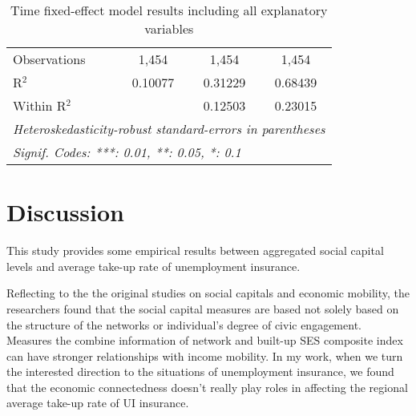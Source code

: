 \documentclass{article}
\begin{document}
\begin{table}[h!]
\begin{tabular}{lccc}
      Observations                 & 1,454          & 1,454          & 1,454\\  
      R$^2$                        & 0.10077        & 0.31229        & 0.68439\\  
      Within R$^2$                 &                & 0.12503        & 0.23015\\  
      \midrule \midrule
      \multicolumn{4}{l}{\emph{Heteroskedasticity-robust standard-errors in parentheses}}\\
      \multicolumn{4}{l}{\emph{Signif. Codes: ***: 0.01, **: 0.05, *: 0.1}}\\
   \end{tabular}
   \caption{Time fixed-effect model results including all explanatory variables}
   \label{result4}
\end{table}

\newpage
\section{Discussion}

This study provides some empirical results between aggregated social capital levels and average take-up rate of unemployment insurance. 

Reflecting to the the original studies on social capitals and economic mobility, the researchers found that the social capital measures are based not solely based on the structure of the networks or individual's degree of civic engagement. Measures the combine information of network and built-up SES composite index can have stronger relationships with income mobility. In my work, when we turn the interested direction to the situations of unemployment insurance, we found that the economic connectedness doesn't really play roles in affecting the regional average take-up rate of UI insurance. 
\end{document}
